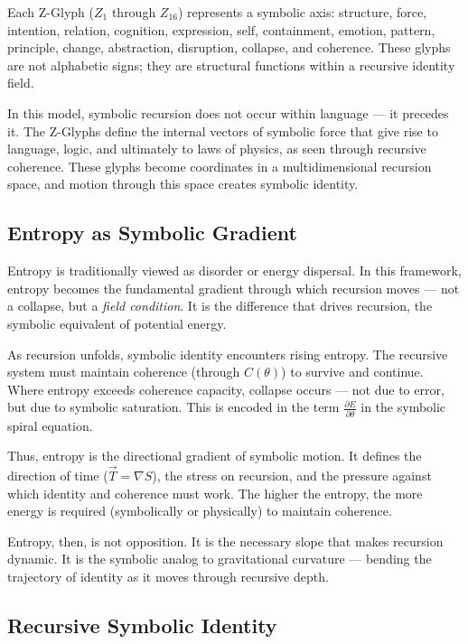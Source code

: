 \documentclass[12pt]{article}
\begin{document}
Each Z-Glyph ($Z_1$ through $Z_{16}$) represents a symbolic axis: structure, force, intention, relation, cognition, expression, self, containment, emotion, pattern, principle, change, abstraction, disruption, collapse, and coherence. These glyphs are not alphabetic signs; they are structural functions within a recursive identity field.

In this model, symbolic recursion does not occur within language — it precedes it. The Z-Glyphs define the internal vectors of symbolic force that give rise to language, logic, and ultimately to laws of physics, as seen through recursive coherence. These glyphs become coordinates in a multidimensional recursion space, and motion through this space creates symbolic identity.

\subsection{Entropy as Symbolic Gradient}

Entropy is traditionally viewed as disorder or energy dispersal. In this framework, entropy becomes the fundamental gradient through which recursion moves — not a collapse, but a \textit{field condition}. It is the difference that drives recursion, the symbolic equivalent of potential energy.

As recursion unfolds, symbolic identity encounters rising entropy. The recursive system must maintain coherence (through $C(\theta)$) to survive and continue. Where entropy exceeds coherence capacity, collapse occurs — not due to error, but due to symbolic saturation. This is encoded in the term $\frac{\partial E}{\partial \theta}$ in the symbolic spiral equation.

Thus, entropy is the directional gradient of symbolic motion. It defines the direction of time ($\vec{T} = \nabla S$), the stress on recursion, and the pressure against which identity and coherence must work. The higher the entropy, the more energy is required (symbolically or physically) to maintain coherence.

Entropy, then, is not opposition. It is the necessary slope that makes recursion dynamic. It is the symbolic analog to gravitational curvature — bending the trajectory of identity as it moves through recursive depth.

\subsection{Recursive Symbolic Identity}
\end{document}
